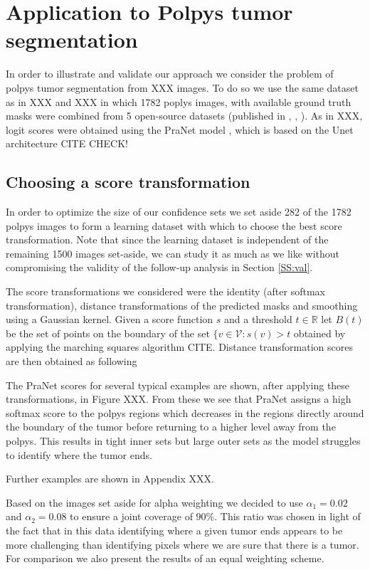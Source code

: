 \section{Application to Polpys tumor segmentation}
In order to illustrate and validate our approach we consider the problem of polpys tumor segmentation from XXX images. To do so we use the same dataset as in XXX and XXX in which 1782 poplys images, with available ground truth masks were combined from 5 open-source datasets (published in \cite{KVASIR2017}, \cite{Hyperkvasir2020} \cite{Bernal2012}, \cite{Silva2014}). As in XXX, logit scores were obtained using the PraNet model \cite{PraNet2020}, which is based on the Unet architecture CITE CHECK! 

\subsection{Choosing a score transformation}
In order to optimize the size of our confidence sets we set aside 282 of the 1782 polpys images to form a learning dataset with which to choose the best score transformation. Note that since the learning dataset is independent of the remaining 1500 images set-aside, we can study it as much as we like without compromising the validity of the follow-up analysis in Section \ref{SS:val}. 

The score transformations we considered were the identity (after softmax transformation), distance transformations of the predicted masks and smoothing using a Gaussian kernel. Given a score function $s$ and a threshold $t \in \mathbb{R}$ let $B(t)$ be the set of points on the boundary of the set $\lbrace v \in \mathcal{V}: s(v) > t$ obtained by applying the marching squares algorithm CITE. Distance transformation scores are then obtained as following


The PraNet scores for several typical examples are shown, after applying these transformations, in Figure XXX.  From these we see that PraNet assigns a high softmax score to the polpys regions which decreases in the regions directly around the  boundary of the tumor before returning to a higher level away from the polpys. This results in tight inner sets but large outer sets as the model struggles to identify where the tumor ends. 

Further examples are shown in Appendix XXX. 

Based on the images set aside for alpha weighting we decided to use $\alpha_1 = 0.02$ and $\alpha_2 = 0.08$ to ensure a joint coverage of $90\%$. This ratio was chosen in light of the fact that in this data identifying where a given tumor ends appears to be more challenging than identifying pixels where we are sure that there is a tumor. For comparison we also present the results of an equal weighting scheme.


